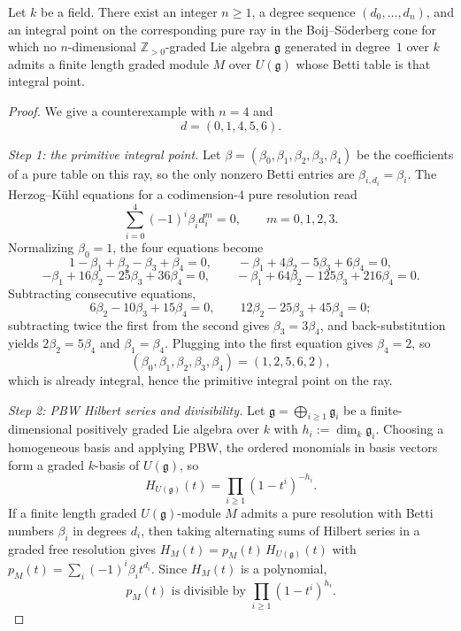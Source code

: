 \documentclass[10pt,a4paper]{amsart}
\begin{document}
\begin{theorem}\label{thm:bs62}
Let $k$ be a field. There exist an integer $n\ge 1$, a degree sequence
$(d_0,\dots,d_n)$, and an integral point on the corresponding pure ray
in the Boij--S\"oderberg cone for which no $n$-dimensional
$\mathbb Z_{>0}$-graded Lie algebra $\mathfrak g$ generated in degree~$1$
over $k$ admits a finite length graded module $M$ over $U(\mathfrak g)$
whose Betti table is that integral point.
\end{theorem}

\begin{proof}
We give a counterexample with $n=4$ and
\[
   d=(0,1,4,5,6).
\]

\smallskip
\noindent\emph{Step 1: the primitive integral point.} Let
$\beta=(\beta_0,\beta_1,\beta_2,\beta_3,\beta_4)$ be the coefficients of
a pure table on this ray, so the only nonzero Betti entries are
$\beta_{i,d_i}=\beta_i$. The Herzog--K\"uhl equations for a codimension-$4$
pure resolution read
\[
   \sum_{i=0}^4 (-1)^i \beta_i d_i^m=0,\qquad m=0,1,2,3.
\]
Normalizing $\beta_0=1$, the four equations become
\[
   1-\beta_1+\beta_2-\beta_3+\beta_4=0,\qquad
   -\beta_1+4\beta_2-5\beta_3+6\beta_4=0,
\]
\[
   -\beta_1+16\beta_2-25\beta_3+36\beta_4=0,\qquad
   -\beta_1+64\beta_2-125\beta_3+216\beta_4=0.
\]
Subtracting consecutive equations,
\[
   6\beta_2-10\beta_3+15\beta_4=0,\qquad
   12\beta_2-25\beta_3+45\beta_4=0;
\]
subtracting twice the first from the second gives $\beta_3=3\beta_4$, and
back-substitution yields $2\beta_2=5\beta_4$ and $\beta_1=\beta_4$.
Plugging into the first equation gives $\beta_4=2$, so
\[
   (\beta_0,\beta_1,\beta_2,\beta_3,\beta_4)=(1,2,5,6,2),
\]
which is already integral, hence the primitive integral point on the
ray.

\smallskip
\noindent\emph{Step 2: PBW Hilbert series and divisibility.} Let
$\mathfrak g=\bigoplus_{i\ge 1}\mathfrak g_i$ be a finite-dimensional
positively graded Lie algebra over $k$ with $h_i:=\dim_k\mathfrak g_i$.
Choosing a homogeneous basis and applying PBW, the ordered monomials in
basis vectors form a graded $k$-basis of $U(\mathfrak g)$, so
\[
   H_{U(\mathfrak g)}(t)=\prod_{i\ge 1}(1-t^i)^{-h_i}.
\]
If a finite length graded $U(\mathfrak g)$-module $M$ admits a pure
resolution with Betti numbers $\beta_i$ in degrees $d_i$, then taking
alternating sums of Hilbert series in a graded free resolution gives
$H_M(t)=p_M(t)\,H_{U(\mathfrak g)}(t)$ with $p_M(t)=\sum_i(-1)^i\beta_i
t^{d_i}$. Since $H_M(t)$ is a polynomial,
\[
   p_M(t) \text{ is divisible by } \prod_{i\ge 1}(1-t^i)^{h_i}.
\]


\end{proof}
\end{document}
